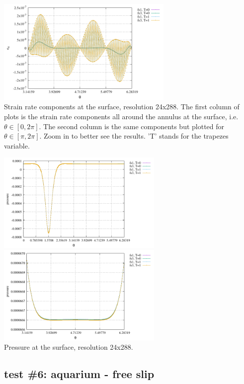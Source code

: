 \begin{center}
\includegraphics[width=8.5cm]{python_codes/fieldstone_151/results/test5/e_rt2}\\
{\captionfont Strain rate components at the surface, resolution 24x288. 
The first column of plots is the strain rate components all around the annulus at the surface, i.e.
$\theta\in[0,2\pi]$. The second column is the same components but plotted for $\theta\in[\pi,2\pi]$.
Zoom in to better see the results. 'T' stands for the trapezes variable.}
\end{center}


\begin{center}
\includegraphics[width=8cm]{python_codes/fieldstone_151/results/test5/p}
\includegraphics[width=8cm]{python_codes/fieldstone_151/results/test5/p2}\\
{\captionfont Pressure at the surface, resolution 24x288.}
\end{center}

\subsection*{test \#6: aquarium - free slip}

